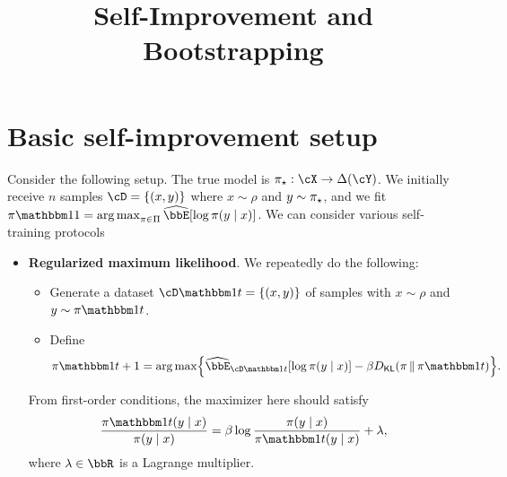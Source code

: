 \documentclass{article}
\title{Self-Improvement and Bootstrapping}
\author{%
%
}
\date{}
\begin{document}
\maketitle

\tableofcontents

\section{Basic self-improvement setup}
Consider the following setup. The true model is $\pistar:\cX\to\Delta(\cY)$. We
initially receive $n$ samples $\cD=\crl*{(x,y)}$ where $x\sim\rho$ and
$y\sim\pi_{\star}$, and we fit $\pi\ind{1}
=\argmax_{\pi\in\Pi}\Eh\brk*{\log\pi(y\mid{}x)}$. We can consider
various self-training protocols
\begin{itemize}
\item \textbf{Regularized maximum likelihood}. We repeatedly do the following:
  \begin{itemize}
  \item Generate a dataset $\cD\ind{t}=\crl*{(x,y)}$ of samples with
    $x\sim\rho$ and $y\sim\pi\ind{t}$.
  \item Define
    \begin{align}
      \label{eq:regularized_mle}
      \pi\ind{t+1}=\argmax\crl*{
      \Eh_{\cD\ind{t}}\brk*{\log\pi(y\mid{}x)}
      -\beta\Dkl{\pi}{\pi\ind{t}}
      }.
    \end{align}
  \end{itemize}
  From first-order conditions, the maximizer here should satisfy
  \[
    \frac{\pi\ind{t}(y\mid{}x)}{\pi(y\mid{}x)}
    =     \beta\log\frac{\pi(y\mid{}x)}{\pi\ind{t}(y\mid{}x)}  + \lambda,
  \]
  where $\lambda\in\bbR$ is a Lagrange multiplier.


\end{itemize}
\end{document}

